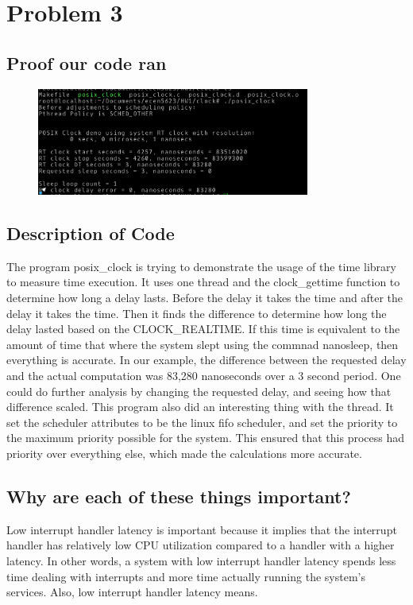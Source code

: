 \documentclass{article}
\begin{document}
\section*{Problem 3}
\subsection*{Proof our code ran}
\begin{figure}[H]
    \centering
    \includegraphics[width=0.8\textwidth]{HW1_P3_code.png}
\end{figure}

\subsection*{Description of Code}
The program posix\_clock is trying to demonstrate the usage of the time library to measure time execution. It uses one thread and the clock\_gettime function to determine how long a delay lasts. Before the delay it takes the time and after the delay it takes the time. Then it finds the difference to determine how long the delay lasted based on the CLOCK\_REALTIME. If this time is equivalent to the amount of time that where the system slept using the commnad nanosleep, then everything
is accurate. In our example, the difference between the requested delay and the actual computation was 83,280 nanoseconds over a 3 second period. One could do further analysis by changing the requested delay, and seeing how that difference scaled.
This program also did an interesting thing with the thread. It set the scheduler attributes to be the linux fifo scheduler, and set the priority to the maximum priority possible for the system. This ensured that this process had priority over everything else, which made the calculations more accurate.

\subsection*{Why are each of these things important?}

\indent Low interrupt handler latency is important because it implies that the interrupt handler has relatively low CPU utilization compared to a handler with a higher latency. In other words, a system with low interrupt handler latency spends less time dealing with interrupts and more time actually running the system's services. Also, low interrupt handler latency means.\\
\end{document}
